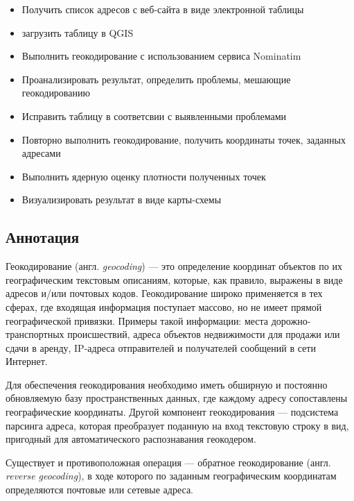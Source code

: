 \documentclass[
  12pt,
]{book}
\providecommand{\tightlist}{%
  \setlength{\itemsep}{0pt}\setlength{\parskip}{0pt}}
\begin{document}
\begin{itemize}
\tightlist
\item
  Получить список адресов с веб-сайта в виде электронной таблицы
\item
  загрузить таблицу в QGIS
\item
  Выполнить геокодирование с использованием сервиса Nominatim
\item
  Проанализировать результат, определить проблемы, мешающие геокодированию
\item
  Исправить таблицу в соответсвии с выявленными проблемами
\item
  Повторно выполнить геокодирование, получить координаты точек, заданных адресами
\item
  Выполнить ядерную оценку плотности полученных точек
\item
  Визуализировать результат в виде карты-схемы
\end{itemize}

\hypertarget{geocoding-annotation}{%
\subsection{Аннотация}\label{geocoding-annotation}}

Геокодирование (англ. \emph{geocoding}) --- это определение координат объектов по их географическим текстовым описаниям, которые, как правило, выражены в виде адресов и/или почтовых кодов. Геокодирование широко применяется в тех сферах, где входящая информация поступает массово, но не имеет прямой географической привязки. Примеры такой информации: места дорожно-транспортных происшествий, адреса объектов недвижимости для продажи или сдачи в аренду, IP-адреса отправителей и получателей сообщений в сети Интернет.

Для обеспечения геокодирования необходимо иметь обширную и постоянно обновляемую базу пространственных данных, где каждому адресу сопоставлены географические координаты. Другой компонент геокодирования --- подсистема парсинга адреса, которая преобразует поданную на вход текстовую строку в вид, пригодный для автоматического распознавания геокодером.

Существует и противоположная операция --- обратное геокодирование (англ. \emph{reverse geocoding}), в ходе которого по заданным географическим координатам определяются почтовые или сетевые адреса.
\end{document}
